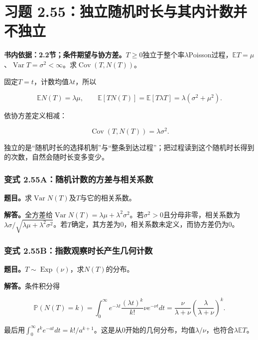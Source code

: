 \documentclass[12pt,a4paper,UTF8,fontset=fandol]{ctexart}
\begin{document}
\section{习题
2.55：独立随机时长与其内计数并不独立}\label{ux4e60ux9898-2.55ux72ecux7acbux968fux673aux65f6ux957fux4e0eux5176ux5185ux8ba1ux6570ux5e76ux4e0dux72ecux7acb}

\textbf{书内依据：2.2节；条件期望与协方差。}\(T\ge0\)独立于整个率\(\lambda\)Poisson过程，\(\mathbb ET=\mu\)、\(\operatorname{Var}T=\sigma^2<\infty\)。求\(\operatorname{Cov}(T,N(T))\)。

固定\(T=t\)，计数均值\(\lambda t\)，所以

\[\mathbb EN(T)=\lambda\mu,\qquad
\mathbb E[TN(T)]=\mathbb E[T\lambda T]=\lambda(\sigma^2+\mu^2).\]

依协方差定义相减：

\[\boxed{\operatorname{Cov}(T,N(T))=\lambda\sigma^2.}\]

独立的是``随机时长的选择机制''与``整条到达过程''；把过程读到这个随机时长得到的次数，自然会随时长变多变少。

\subsubsection{变式
2.55A：随机计数的方差与相关系数}\label{ux53d8ux5f0f-2.55aux968fux673aux8ba1ux6570ux7684ux65b9ux5deeux4e0eux76f8ux5173ux7cfbux6570}

\textbf{题目。}求\(\operatorname{Var}N(T)\)及\(T\)与它的相关系数。

\textbf{解答。}全方差给\(\operatorname{Var}N(T)=\lambda\mu+\lambda^2\sigma^2\)。若\(\sigma^2>0\)且分母非零，相关系数为\(\lambda\sigma/\sqrt{\lambda\mu+\lambda^2\sigma^2}\)。若\(T\)确定，其方差为0，相关系数未定义，而协方差仍为0。

\subsubsection{变式
2.55B：指数观察时长产生几何计数}\label{ux53d8ux5f0f-2.55bux6307ux6570ux89c2ux5bdfux65f6ux957fux4ea7ux751fux51e0ux4f55ux8ba1ux6570}

\textbf{题目。}\(T\sim\operatorname{Exp}(\nu)\)，求\(N(T)\)的分布。

\textbf{解答。}条件积分得

\[\mathbb P(N(T)=k)=\int_0^\infty e^{-\lambda t}\frac{(\lambda t)^k}{k!}
\nu e^{-\nu t}dt
=\frac\nu{\lambda+\nu}\left(\frac\lambda{\lambda+\nu}\right)^k.\]

最后用\(\int_0^\infty t^ke^{-at}dt=k!/a^{k+1}\)。这是从0开始的几何分布，均值\(\lambda/\nu\)，也符合\(\lambda\mathbb ET\)。
\end{document}
